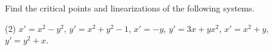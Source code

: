 \documentclass{ximera}
\begin{document}
\begin{exercise}
    Find the critical points and linearizations of the following systems.
    \begin{tasks}(2)
        \task $x'=x^2-y^2$, \enspace $y'=x^2+y^2-1$,
        \task $x'=-y$, \enspace $y'=3x+yx^2$,
        \task $x'=x^2+y$, \enspace $y'=y^2+x$.
    \end{tasks}
\end{exercise}
\end{document}
